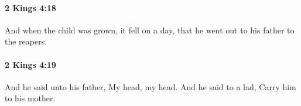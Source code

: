 		\paragraph{2 Kings 4:18} %
			\label{2KINGS-4-18}

			And when the child was grown, it fell on a day, that he went out to his father to the reapers.


		\paragraph{2 Kings 4:19} %
			\label{2KINGS-4-19}

			And he said unto his father, My head, my head. And he said to a lad, Carry him to his mother.


